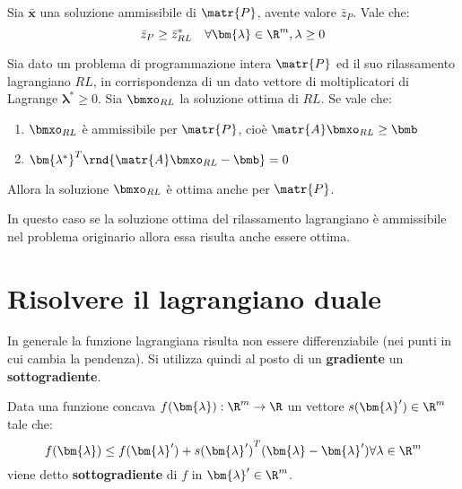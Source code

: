 \documentclass[\main/main.tex]{subfiles}
\begin{document}
\begin{theorem}
    Sia \(\bar{\bm{x}}\) una soluzione ammissibile di \(\matr{P}\), avente valore \(\bar{z}_P\). Vale che:
    \[
        \bar{z}_P \geq \bar{z}^*_{RL} \quad \forall \bm{\lambda} \in \R^m, \lambda \geq 0
    \]\end{theorem}

\begin{theorem}
    Sia dato un problema di programmazione intera \(\matr{P}\) ed il suo rilassamento lagrangiano \(RL\), in corrispondenza di un dato vettore di moltiplicatori di Lagrange \(\bm{\lambda}^*\geq 0\). Sia \(\bmxo_{RL}\) la soluzione ottima di \(RL\). Se vale che:
    \begin{enumerate}
        \item \(\bmxo_{RL}\) è ammissibile per \(\matr{P}\), cioè \(\matr{A}\bmxo_{RL} \geq \bmb \)
        \item \({\bm{\lambda^*}}^T \rnd{\matr{A}\bmxo_{RL}-\bmb}=0\)
    \end{enumerate}
    Allora la soluzione \(\bmxo_{RL}\) è ottima anche per \(\matr{P}\).
\end{theorem}

\begin{corollary}
    In questo caso se la soluzione ottima del rilassamento lagrangiano è ammissibile nel problema originario allora essa risulta anche essere ottima.
\end{corollary}

\section{Risolvere il lagrangiano duale}
In generale la funzione lagrangiana risulta non essere differenziabile (nei punti in cui cambia la pendenza). Si utilizza quindi al posto di un \textbf{gradiente} un \textbf{sottogradiente}.

\begin{definition}[Sottogradiente]
    Data una funzione concava \(f(\bm{\lambda}): \R^m \rightarrow \R \) un vettore \(s(\bm{\lambda}') \in \R^m\) tale che:
    \[
        f(\bm{\lambda}) \leq f(\bm{\lambda}') + {s(\bm{\lambda}')}^T(\bm{\lambda}-\bm{\lambda}') \forall \lambda \in \R^m
    \]    viene detto \textbf{sottogradiente} di \(f\) in \(\bm{\lambda}' \in \R^m\).
\end{definition}
\end{document}
